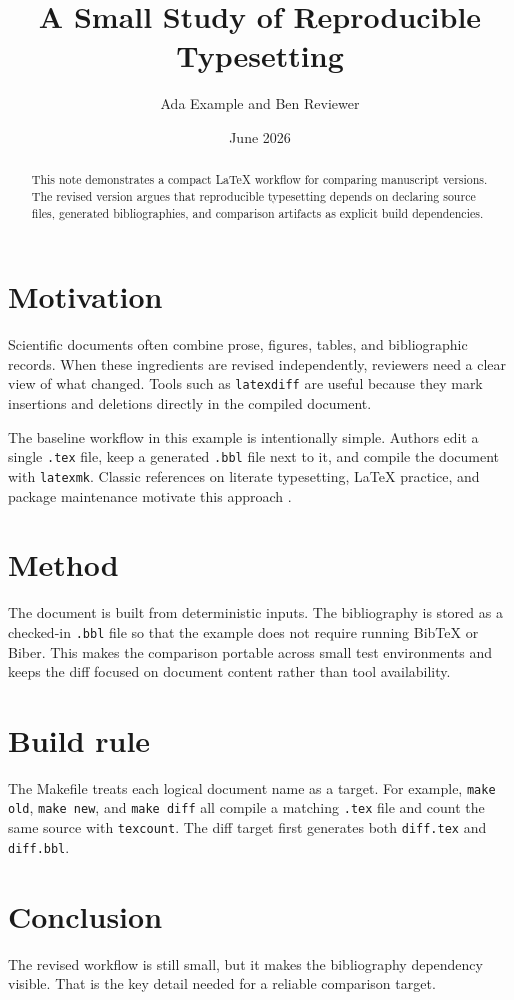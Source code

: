 \documentclass{article}
\title{A Small Study of Reproducible Typesetting}
\author{Ada Example and Ben Reviewer}
\date{June 2026}
\begin{document}
\maketitle

\begin{abstract}
This note demonstrates a compact LaTeX workflow for comparing manuscript
versions. The revised version argues that reproducible typesetting depends on
declaring source files, generated bibliographies, and comparison artifacts as
explicit build dependencies.
\end{abstract}

\section{Motivation}

Scientific documents often combine prose, figures, tables, and bibliographic
records. When these ingredients are revised independently, reviewers need a
clear view of what changed. Tools such as \texttt{latexdiff} are useful because
they mark insertions and deletions directly in the compiled document.

The baseline workflow in this example is intentionally simple. Authors edit a
single \texttt{.tex} file, keep a generated \texttt{.bbl} file next to it, and
compile the document with \texttt{latexmk}. Classic references on literate
typesetting, LaTeX practice, and package maintenance motivate this approach
\cite{knuth1984,lamport1994,mittelbach2004}.

\section{Method}

The document is built from deterministic inputs. The bibliography is stored as
a checked-in \texttt{.bbl} file so that the example does not require running
BibTeX or Biber. This makes the comparison portable across small test
environments and keeps the diff focused on document content rather than tool
availability.

\section{Build rule}

The Makefile treats each logical document name as a target. For example,
\texttt{make old}, \texttt{make new}, and \texttt{make diff} all compile a
matching \texttt{.tex} file and count the same source with \texttt{texcount}.
The diff target first generates both \texttt{diff.tex} and \texttt{diff.bbl}.

\section{Conclusion}

The revised workflow is still small, but it makes the bibliography dependency
visible. That is the key detail needed for a reliable comparison target.


\end{document}
